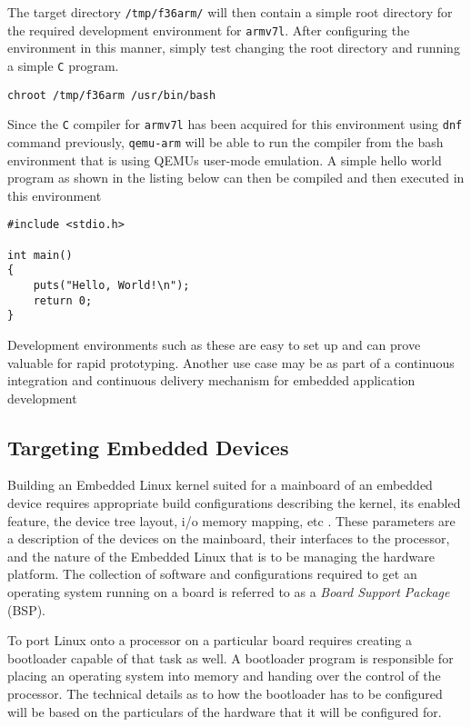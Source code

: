 The target directory \texttt{/tmp/f36arm/} will then contain a simple root directory for the required development environment for \texttt{armv7l}. After configuring the environment in this manner, simply test changing the root directory and running a simple \texttt{C} program.

\begin{verbatim}
chroot /tmp/f36arm /usr/bin/bash
\end{verbatim}

Since the \texttt{C} compiler for \texttt{armv7l} has been acquired for this environment using \texttt{dnf} command previously, \texttt{qemu-arm} will be able to run the compiler from the bash environment that is using QEMU\textquotesingle s user-mode emulation. A simple hello world program as shown in the listing below can then be compiled and then executed in this environment

\begin{verbatim}
#include <stdio.h>

int main()
{
	puts("Hello, World!\n");
	return 0;
}
\end{verbatim}

Development environments such as these are easy to set up and can prove valuable for rapid prototyping. Another use case may be as part of a continuous integration and continuous delivery mechanism for embedded application development

\subsection{Targeting Embedded Devices}

Building an Embedded Linux kernel suited for a mainboard of an embedded device requires appropriate build configurations describing the kernel, its enabled feature, the device tree layout, i/o memory mapping, etc \cite{bootlin-port}. These parameters are a description of the devices on the mainboard, their interfaces to the processor, and the nature of the Embedded Linux that is to be managing the hardware platform. The collection of software and configurations required to get an operating system running on a board is referred to as a \textit{Board Support Package} (BSP).


To port Linux onto a processor on a particular board requires creating a bootloader capable of that task as well. A bootloader program is responsible for placing an operating system into memory and handing over the control of the processor. The technical details as to how the bootloader has to be configured will be based on the particulars of the hardware that it will be configured for.

